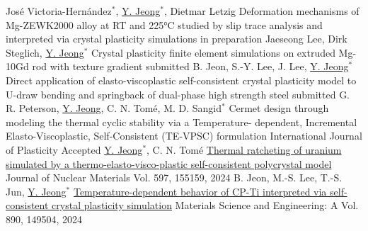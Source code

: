 
\begin{cventries}



  \cventry
  {Jos\'{e} Victoria-Hern\'{a}ndez$^*$, \underline{Y. Jeong}$^*$, Dietmar Letzig}
  {Deformation mechanisms of Mg-ZEWK2000 alloy at RT and 225°C studied by slip trace analysis and interpreted via crystal plasticity simulations}
  {in preparation}
  {}
  {
  }
  \cventry
  {Jaeseong Lee, Dirk Steglich, \underline{Y. Jeong}$^*$}
  {Crystal plasticity finite element simulations on extruded Mg-10Gd rod with texture gradient}
  {submitted}
  {}
  {
  }
  \cventry
  {B. Jeon, S.-Y. Lee, J. Lee, \underline{Y. Jeong}$^*$}
  {Direct application of elasto-viscoplastic self-consistent crystal plasticity model to U-draw bending and springback of dual-phase high strength steel}
  {submitted}
  {}
  {
  }
  \cventry
  {G. R. Peterson, \underline{Y. Jeong}, C. N. Tom\'{e}, M. D. Sangid$^*$}
  {Cermet design through modeling the thermal cyclic stability via a Temperature- dependent, Incremental Elasto-Viscoplastic, Self-Consistent (TE-VPSC) formulation}
  {International Journal of Plasticity}
  {Accepted}
  {
  }
  \cventry
  {\underline{Y. Jeong}$^*$, C. N. Tom\'{e}}
  {\href{https://doi.org/10.1016/j.jnucmat.2024.155159}{Thermal ratcheting of uranium simulated by a thermo-elasto-visco-plastic self-consistent polycrystal model}}
  {Journal of Nuclear Materials}
  {Vol. 597, 155159, 2024}
  {
  }
  \cventry
  {B. Jeon, M.-S. Lee, T.-S. Jun, \underline{Y. Jeong}$^*$}
  {\href{https://doi.org/10.1016/j.msea.2023.145904}{Temperature-dependent behavior of CP-Ti interpreted via self-consistent crystal plasticity simulation}}
  {Materials Science and Engineering: A}
  {Vol. 890, 149504, 2024}

\end{cventries}
